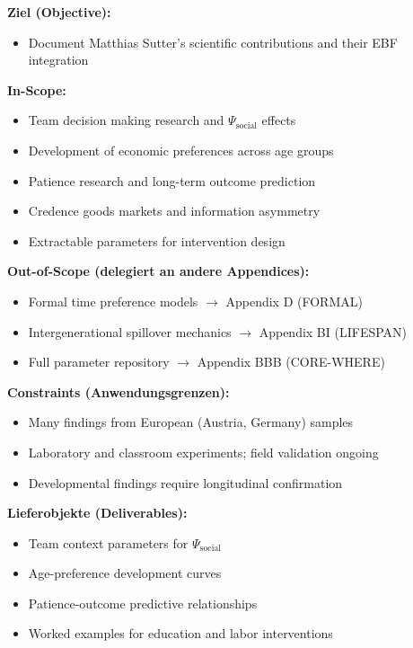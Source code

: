 \begin{tcolorbox}[
    colback=orange!5!white,
    colframe=orange!75!black,
    title={\textbf{Appendix Scope: Ziel / In-Scope / Out-of-Scope / Constraints}},
    fonttitle=\bfseries
]

\textbf{Ziel (Objective):}
\begin{itemize}[nosep]
    \item Document Matthias Sutter's scientific contributions and their EBF integration
\end{itemize}

\textbf{In-Scope:}
\begin{itemize}[nosep]
    \item Team decision making research and $\Psi_{\text{social}}$ effects
    \item Development of economic preferences across age groups
    \item Patience research and long-term outcome prediction
    \item Credence goods markets and information asymmetry
    \item Extractable parameters for intervention design
\end{itemize}

\textbf{Out-of-Scope (delegiert an andere Appendices):}
\begin{itemize}[nosep]
    \item Formal time preference models $\rightarrow$ Appendix D (FORMAL)
    \item Intergenerational spillover mechanics $\rightarrow$ Appendix BI (LIFESPAN)
    \item Full parameter repository $\rightarrow$ Appendix BBB (CORE-WHERE)
\end{itemize}

\textbf{Constraints (Anwendungsgrenzen):}
\begin{itemize}[nosep]
    \item Many findings from European (Austria, Germany) samples
    \item Laboratory and classroom experiments; field validation ongoing
    \item Developmental findings require longitudinal confirmation
\end{itemize}

\textbf{Lieferobjekte (Deliverables):}
\begin{itemize}[nosep]
    \item Team context parameters for $\Psi_{\text{social}}$
    \item Age-preference development curves
    \item Patience-outcome predictive relationships
    \item Worked examples for education and labor interventions
\end{itemize}

\end{tcolorbox}


